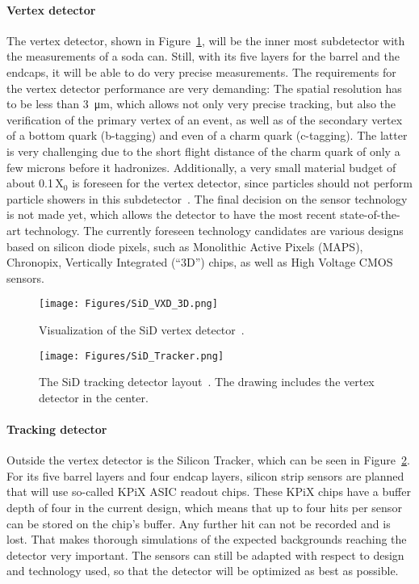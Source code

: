 \paragraph{Vertex detector}
The vertex detector, shown in Figure~\ref{fig:SiD_VXD}, will be the inner most subdetector with the measurements of a soda can.
Still, with its five layers for the barrel and the endcaps, it will be able to do very precise measurements.
The requirements for the vertex detector performance are very demanding:
The spatial resolution has to be less than \SI{3}{\micro\meter}, which allows not only very precise tracking, but also the verification of the primary vertex of an event, as well as of the secondary vertex of a bottom quark (b-tagging) and even of a charm quark (c-tagging).
The latter is very challenging due to the short flight distance of the charm quark of only a few microns before it hadronizes.
Additionally, a very small material budget of about 0.1\,X$_0$ is foreseen for the vertex detector, since particles should not perform particle showers in this subdetector~\cite{SiD_Update}.
The final decision on the sensor technology is not made yet, which allows the detector to have the most recent state-of-the-art technology.
The currently foreseen technology candidates are various designs based on silicon diode pixels, such as Monolithic Active Pixels (MAPS), Chronopix, Vertically Integrated (``3D'') chips, as well as High Voltage CMOS sensors. 
\begin{figure}[h]
\centering
\texttt{[image: Figures/SiD\_VXD\_3D.png]}
\caption[Visualization of the SiD vertex detector]{Visualization of the SiD vertex detector~\cite{SiD_Update2}.}
\label{fig:SiD_VXD}
\end{figure}
\begin{figure}[h!]
\centering
\texttt{[image: Figures/SiD\_Tracker.png]}
\caption[Drawing of the SiD tracking detector]{The SiD tracking detector layout~\cite{SiD_Update2}.
The drawing includes the vertex detector in the center.}
\label{fig:SiD_tracker}
\end{figure}

\paragraph{Tracking detector}
Outside the vertex detector is the Silicon Tracker, which can be seen in Figure~\ref{fig:SiD_tracker}.
For its five barrel layers and four endcap layers, silicon strip sensors are planned that will use so-called KPiX ASIC readout chips.
These KPiX chips have a buffer depth of four in the current design, which means that up to four hits per sensor can be stored on the chip's buffer.
Any further hit can not be recorded and is lost.
That makes thorough simulations of the expected backgrounds reaching the detector very important.
The sensors can still be adapted with respect to design and technology used, so that the detector will be optimized as best as possible.

